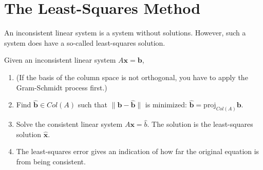 \section{The Least-Squares Method}

An inconsistent linear system is a system without solutions.
However, such a system does have a so-called least-squares solution.

\begin{paracol}{2}


\switchcolumn


\end{paracol}

Given an inconsistent linear system $A\mathbf{x} = \mathbf{b}$,
\begin{enumerate}
    \item (If the basis of the column space is not orthogonal, you have to apply the Gram-Schmidt process first.)
    \item Find $\hat{\mathbf{b}} \in Col(A)$ such that $\|\mathbf{b} - \hat{\mathbf{b}}\|$ is minimized: $\hat{\mathbf{b}} = \text{proj}_{Col(A)}\mathbf{b}$.
    \item Solve the consistent linear system $A\mathbf{x} = \hat{b}$. The solution is the least-squares solution $\hat{\mathbf{x}}$.
    \item The least-squares error gives an indication of how far the original equation is from being consistent. \\
\end{enumerate}

